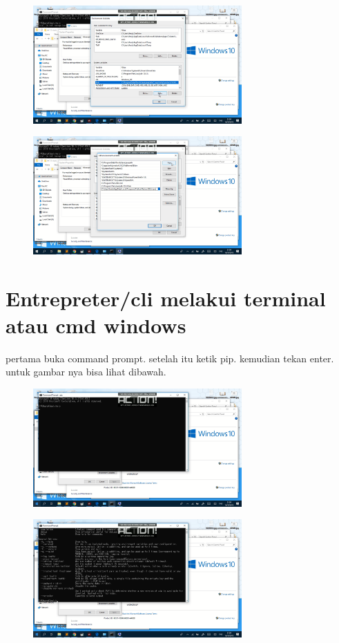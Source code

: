 \begin{figure}[H]
	\centering
	\includegraphics[width=8cm]{figures/3-4.png}
	\end{figure}
	
\begin{figure}[H]
	\centering
	\includegraphics[width=8cm]{figures/3-5.png}
	
\end{figure}

\section{Entrepreter/cli melakui terminal atau cmd windows}
pertama buka command prompt. setelah itu ketik pip. kemudian tekan enter. untuk gambar nya bisa lihat dibawah.
\begin{figure}[H]
	\centering
	\includegraphics[width=8cm]{figures/4-1.png}
\end{figure}

\begin{figure}[H]
	\centering
	\includegraphics[width=8cm]{figures/4-2.png}
\end{figure}

